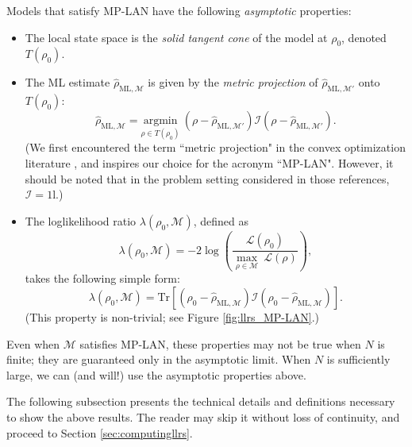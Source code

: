 \documentclass[aps,pra, twocolumn]{revtex4-1}
\newcommand{\M}{\mathcal{M}}
\newcommand{\cL}{\mathcal{L}}
\newcommand{\Id}{\mathbb{I}}
\def\Id{1\!\mathrm{l}}
\newcommand{\rhohat}{\hat{\rho}}
\newcommand{\rhoML}[1]{\rhohat_{\scriptscriptstyle{\mathrm{ML},#1}}}
\begin{document}
Models that satisfy MP-LAN have the following \emph{asymptotic} properties:
\begin{itemize}[nosep]
\item The local state space is the \emph{solid tangent cone} of the model at $\rho_{0}$, denoted $T(\rho_{0})$.
\item The ML estimate $\rhoML{\M}$ is given by the \emph{metric projection} of $\rhoML{\M'}$ onto $T(\rho_{0})$:
\begin{equation}
\label{eq:MP-LANmle}
\rhoML{\M} = \underset{\rho \in T(\rho_{0})}{\text{argmin}}~(\rho  -\rhoML{\M'})\mathcal{I}(\rho  -\rhoML{\M'}).
\end{equation}
(We first encountered the term ``metric projection" in the convex optimization literature \cite{McCoy2014, Amelunxen2014}, and inspires our choice for the acronym ``MP-LAN". However, it should be noted that in the problem setting considered in those references, $\mathcal{I} = \Id$.)

\item The loglikelihood ratio $\lambda(\rho_{0}, \M)$, defined as
\begin{equation}
\label{eq:llrs_lan_2}
\lambda(\rho_{0}, \M) = -2 \log \left(\frac{\cL(\rho_{0})}{\underset{\rho \in \M}{\max}~\cL(\rho)}\right),
\end{equation}
takes the following simple form:
\begin{equation}
\label{eq:llrs_lan}
\lambda(\rho_{0}, \M) =  \mathrm{Tr}[(\rho_{0} - \rhoML{\M})\mathcal{I}(\rho_{0} - \rhoML{\M})].
\end{equation}
(This property is non-trivial; see Figure \ref{fig:llrs_MP-LAN}.)
\end{itemize}



Even when $\M$ satisfies MP-LAN, these properties may not be true when $N$ is finite; they are guaranteed only in the asymptotic limit. When $N$ is sufficiently large, we can (and will!) use the asymptotic properties above.

The following subsection presents the technical details and definitions necessary to show the above results. The reader may skip it without loss of continuity, and proceed to Section \ref{sec:computingllrs}.
\end{document}
